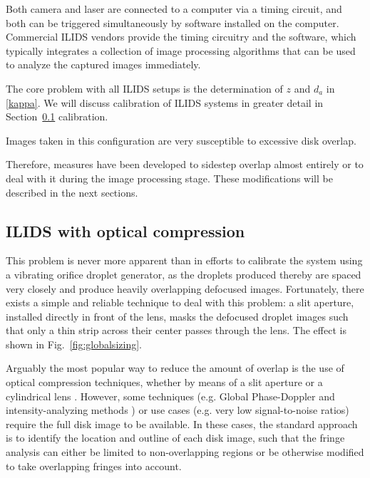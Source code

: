\documentclass[11.5pt,oneside]{book}
\newcommand*{\figref}[1]{Fig.~\ref{#1}}
\newcommand*{\secref}[1]{Section~\ref{#1}}
\begin{document}
Both camera and laser are connected to a computer via a timing circuit, and both
can be triggered simultaneously by software installed on the computer.
Commercial ILIDS vendors provide the timing circuitry and the software, which
typically integrates a collection of image processing algorithms that can be
used to analyze the captured images immediately.

The core problem with all ILIDS setups is the determination of $z$ and $d_a$ in
\eqref{kappa}.  We will discuss calibration of ILIDS systems in greater detail in
\secref{} calibration.

Images taken in this configuration are very susceptible to excessive
disk overlap.


Therefore, measures have been developed to sidestep overlap
almost entirely or to deal with it during the image processing stage. These
modifications will be described in the next sections.

\subsection{ILIDS with optical compression}
This problem is never more apparent than in efforts to calibrate
the system using a vibrating orifice droplet generator, as the droplets produced
thereby are spaced very closely and produce heavily overlapping defocused
images. Fortunately, there exists a simple and reliable technique to deal with
this problem: a slit aperture, installed directly in front of the lens, masks
the defocused droplet images such that only a thin strip across their center
passes through the lens. The effect is shown in \figref{fig:globalsizing}. 

Arguably the most popular way to reduce the amount of overlap is the use of
optical compression techniques, whether by means of a slit aperture \cite{Pan06}
or a cylindrical lens \cite{Kawaguchi02, Maeda02}. However, some techniques
(e.g. Global Phase-Doppler \cite{Damaschke01} and intensity-analyzing
methods \cite{Querel10}) or use cases (e.g. very low signal-to-noise ratios)
require the full disk image to be available. In these cases, the standard
approach is to identify the location and outline of each disk image, such that
the fringe analysis can either be limited to non-overlapping regions or be
otherwise modified to take overlapping fringes into account.
\end{document}
